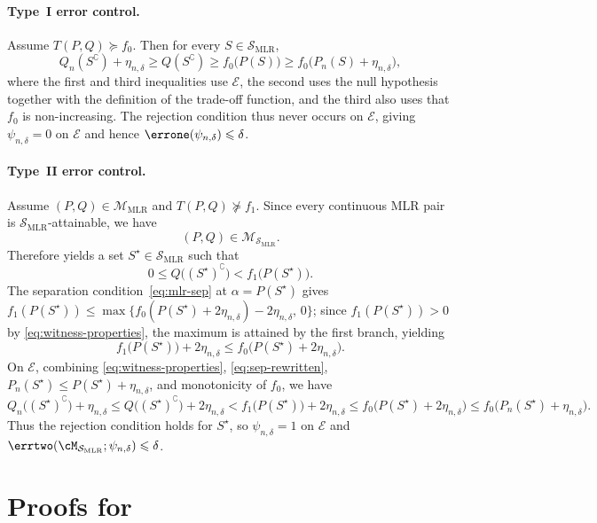 \documentclass[english]{article}
\theoremstyle{plain}
\theoremstyle{definition}
\newcommand{\Toff}[2]{T(#1,#2)}
\newcommand{\fnull}{f_0}
\newcommand{\falt}{f_1}
\newcommand{\smlr}{\mathcal{S}_{\mathrm{MLR}}}     %
\newcommand{\etaND}{\eta_{n,\delta}}               %
\begin{document}
\paragraph{Type~I error control.}
Assume $\Toff{P}{Q}\succeq \fnull$. Then for every $S\in\smlr$,
\[
Q_n(S^\complement)+\etaND
\geqslant Q(S^\complement)
\geqslant \fnull\bigl(P(S)\bigr)
\geqslant \fnull\bigl(P_n(S)+\etaND\bigr),
\]
where the first and third inequalities use $\mathcal E$, the second uses the null hypothesis together with the definition of the trade-off function, and the third also uses that $\fnull$ is non-increasing. The rejection condition thus never occurs on $\mathcal E$, giving $\psi_{n,\delta}=0$ on $\mathcal E$ and hence $\errone(\psi_{n,\delta})\leqslant\delta$.

\paragraph{Type~II error control.}
Assume \((P,Q)\in\mathcal M_{\mathrm{MLR}}\) and \(\Toff{P}{Q}\nsucceq \falt\).
Since every continuous MLR pair is \(\smlr\)-attainable, we have
\[
(P,Q)\in\mathcal M_{\smlr}.
\]
Therefore  yields a set \(S^\star\in\smlr\) such that
\begin{equation}\label{eq:witness-properties}
0\leqslant Q\bigl((S^\star)^\complement\bigr)<\falt\bigl(P(S^\star)\bigr).
\end{equation}
The separation condition~\eqref{eq:mlr-sep} at $\alpha=P(S^\star)$ gives $\falt(P(S^\star))\leqslant\max\{\fnull(P(S^\star)+2\etaND)-2\etaND,\,0\}$; since $\falt(P(S^\star))>0$ by \eqref{eq:witness-properties}, the maximum is attained by the first branch, yielding
\begin{equation}\label{eq:sep-rewritten}
\falt\bigl(P(S^\star)\bigr)+2\etaND\leqslant \fnull\bigl(P(S^\star)+2\etaND\bigr).
\end{equation}
On $\mathcal E$, combining \eqref{eq:witness-properties}, \eqref{eq:sep-rewritten}, $P_n(S^\star)\leqslant P(S^\star)+\etaND$, and monotonicity of $\fnull$, we have
\[
Q_n\bigl((S^\star)^\complement\bigr)+\etaND
\leqslant Q\bigl((S^\star)^\complement\bigr)+2\etaND
<\falt\bigl(P(S^\star)\bigr)+2\etaND
\leqslant \fnull\bigl(P(S^\star)+2\etaND\bigr)
\leqslant \fnull\bigl(P_n(S^\star)+\etaND\bigr).
\]
Thus the rejection condition holds for $S^\star$, so $\psi_{n,\delta}=1$ on $\mathcal E$ and $\errtwo(\cM_{\smlr};\psi_{n,\delta})\leqslant\delta$.


\section{Proofs for }\label{app:general}
\end{document}
